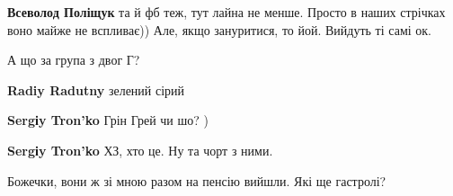 \begin{itemize}
\begin{itemize}
\textbf{Всеволод Поліщук} та й фб теж, тут лайна не менше. Просто в наших стрічках воно майже не вспливає)) Але, якщо зануритися, то йой. Вийдуть ті самі ок.
\end{itemize}

 
А що за група з двог Г?

\begin{itemize}
 
\textbf{Radiy Radutny} зелений сірий

 
\textbf{Sergіy Tron'ko} Грін Грей чи шо? )

 
\textbf{Sergіy Tron'ko} ХЗ, хто це. Ну та чорт з ними.

 
Божечки, вони ж зі мною разом на пенсію вийшли. Які ще гастролі?
\end{itemize}

 

\end{itemize}
